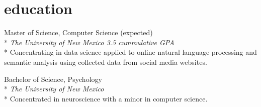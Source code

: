 \documentclass[]{friggeri-cv} %
\begin{document}
\section{education}
\begin{description}
  \item {\largeheaderfont Master of Science, Computer Science}  \hfill 
    { (expected)} \\*
    {\footnotesize \emph{The University of New Mexico  \hfill 3.5 cummulative GPA}} \\*
    Concentrating in data science applied to online natural language processing
    and semantic analysis using collected data from social media websites.
\end{description}
\begin{description}
  \item  {\largeheaderfont Bachelor of Science, Psychology } \hfill
    { }\\*
    {\footnotesize \emph{The University of New Mexico  }} \\*
    Concentrated in neuroscience with a minor in computer science.
\end{description}
\end{document}
